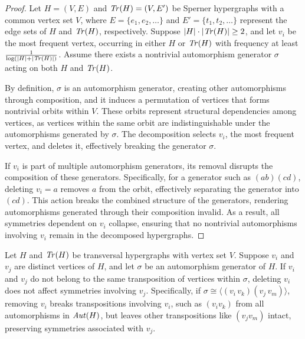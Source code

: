 \begin{proof}
Let $H=(V,E)$ and $\mathit{Tr}(H)=(V,E')$ be Sperner hypergraphs with a common vertex set $V$, where $E=\{e_1,e_2,\dots\}$ and $E'=\{t_1,t_2,\dots\}$ represent the edge sets of $H$ and $\mathit{Tr}(H)$, respectively. Suppose $|H|\cdot|\mathit{Tr}(H)|\geq 2$, and let $v_i$ be the most frequent vertex, occurring in either $H$ or $\mathit{Tr}(H)$ with frequency at least $\frac{1}{\log(|H|+|\mathit{Tr}(H)|)}$. Assume there exists a nontrivial automorphism generator $\sigma$ acting on both $H$ and $\mathit{Tr}(H)$.

By definition, $\sigma$ is an automorphism generator, creating other automorphisms through composition, and it induces a permutation of vertices that forms nontrivial orbits within $V$. These orbits represent structural dependencies among vertices, as vertices within the same orbit are indistinguishable under the automorphisms generated by $\sigma$. The \FKA{} decomposition selects $v_i$, the most frequent vertex, and deletes it, effectively breaking the generator $\sigma$.

If $v_i$ is part of multiple automorphism generators, its removal disrupts the composition of these generators. Specifically, for a generator such as $(ab)(cd)$, deleting $v_i=a$ removes $a$ from the orbit, effectively separating the generator into $(cd)$. This action breaks the combined structure of the generators, rendering automorphisms generated through their composition invalid. As a result, all symmetries dependent on $v_i$ collapse, ensuring that no nontrivial automorphisms involving $v_i$ remain in the decomposed hypergraphs.
\end{proof}

\begin{lemma}\label{lem:independent}
Let $H$ and $\mathit{Tr}(H)$ be transversal hypergraphs with vertex set $V$. Suppose $v_i$ and $v_j$ are distinct vertices of $H$, and let $\sigma$ be an automorphism generator of $H$. If $v_i$ and $v_j$ do not belong to the same transposition of vertices within $\sigma$, deleting $v_i$ does not affect symmetries involving $v_j$. Specifically, if $\sigma\cong\langle(v_i\,v_k)(v_j\,v_m)\rangle$, removing $v_i$ breaks transpositions involving $v_i$, such as $(v_iv_k)$ from all automorphisms in $\mathit{Aut}(H)$, but leaves other transpositions like $(v_jv_m)$ intact, preserving symmetries associated with $v_j$.
\end{lemma}

